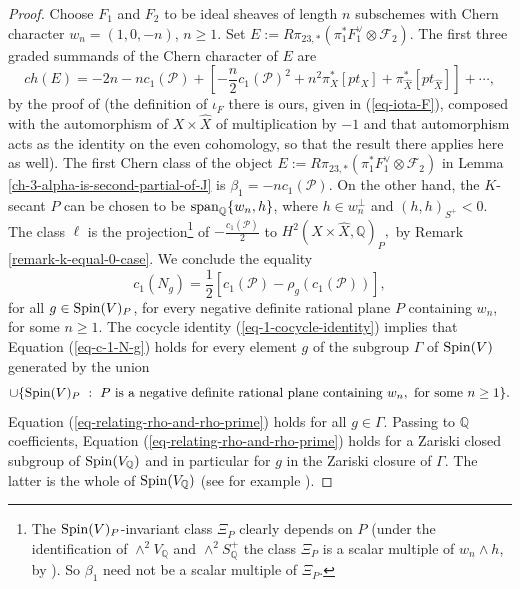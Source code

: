 \documentclass[12pt]{amsart}
\numberwithin{equation}{subsection}
\theoremstyle{plain}
\theoremstyle{definition}
\newcommand{\F}{{\mathcal F}}
\newcommand{\QQ}{{\mathbb Q}}
\renewcommand{\P}{{\mathcal P}}
\newcommand{\Spin}{{\rm Spin}}
\renewcommand{\span}{{\rm span}}
\begin{document}
\begin{proof}
Choose $F_1$ and $F_2$ to be ideal sheaves of length $n$ subschemes with Chern character $w_n=(1,0,-n)$, $n\geq 1$. 
Set $E:=R\pi_{23,*}(\pi_1^*F_1^\vee\otimes \F_2)$.
The first three graded summands of the Chern character of $E$ are
\[
ch(E)=
-2n-nc_1(\P)+
\left[-\frac{n}{2}c_1(\P)^2+n^2\pi_X^*[pt_X]+\pi_{\hat{X}}^*[pt_{\hat{X}}]\right] + \cdots,
\]
by the proof of \cite[Prop. 11.2]{markman-generalized-kummers} (the definition of $\iota_F$ there is ours, given in (\ref{eq-iota-F}),  composed with the automorphism of $X\times\hat{X}$ of multiplication by $-1$ and that automorphism acts as the identity on the even cohomology, so that the result there applies here as well).
The first Chern class of the object 
$E:=R\pi_{23,*}(\pi_1^*F_1^\vee\otimes \F_2)$ in Lemma \ref{ch-3-alpha-is-second-partial-of-J} is $\beta_1=-nc_1(\P)$.
On the other hand, the $K$-secant $P$ can be chosen to be $\span_\QQ\{w_n,h\}$, where $h\in w_n^\perp$ and $(h,h)_{S^+}<0$.  
The class $\ell$ is the projection\footnote{The $\Spin(V)_P$-invariant class $\Xi_P$ clearly depends on $P$ (under the identification of $\wedge^2V_\QQ$ and $\wedge^2S^+_\QQ$ the class $\Xi_P$ is a scalar multiple of $w_n\wedge h$, 
by \cite[(12.5)]{markman-generalized-kummers}).
So $\beta_1$ need not be a scalar multiple of $\Xi_P$.
} 
of $-\frac{c_1(\P)}{2}$ to $H^2(X\times\hat{X},\QQ)_P,$ by Remark \ref{remark-k-equal-0-case}. 
We conclude the equality
\begin{equation}
\label{eq-c-1-N-g}
c_1(N_g)=\frac{1}{2}\left[c_1(\P)-\rho_g(c_1(\P))\right],
\end{equation}
for all $g\in\Spin(V)_P$, for every negative definite rational plane $P$ containing $w_n$, for some $n\geq 1$. 
The cocycle identity (\ref{eq-1-cocycle-identity}) implies that 
Equation (\ref{eq-c-1-N-g}) holds for every element $g$ of the subgroup $\Gamma$ of $\Spin(V)$ generated by the union 
\[
\cup \{\Spin(V)_P \ : \ P \ \mbox{is a negative definite rational plane containing} \ w_n, \ \mbox{for some} \ n\geq 1\}.
\]
Equation (\ref{eq-relating-rho-and-rho-prime}) holds for all $g\in \Gamma$. 
Passing to $\QQ$ coefficients, Equation (\ref{eq-relating-rho-and-rho-prime}) holds for a Zariski closed subgroup of $\Spin(V_\QQ)$ and in particular for $g$ in the Zariski closure of $\Gamma$.
The latter is the whole of $\Spin(V_\QQ)$ (see for example \cite[Th. 2.1]{verbitsky}).
\end{proof}
\end{document}
